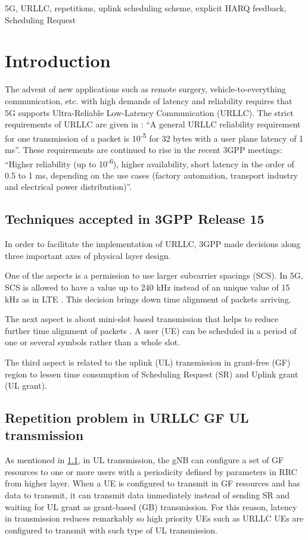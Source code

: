 \documentclass[conference]{IEEEtran}
\begin{document}
\begin{IEEEkeywords}
5G, URLLC, repetitions, uplink scheduling scheme, explicit HARQ feedback, Scheduling Request
\end{IEEEkeywords}

\section{Introduction} \label{I}
The advent of new applications such as remote surgery, vehicle-to-everything communication, etc. with high demands of latency and reliability requires that 5G supports Ultra-Reliable Low-Latency Communication (URLLC). The strict requirements of URLLC are given in \cite{b6}: ``A general URLLC reliability requirement for one transmission of a packet is 10\textsuperscript{-5} for 32 bytes with a user plane latency of 1 ms''. These requirements are continued to rise in the recent 3GPP meetings: ``Higher reliability (up to 10\textsuperscript{-6}), higher availability, short latency in the order of 0.5 to 1 ms, depending on the use cases (factory automation, transport industry and electrical power distribution)''\cite{b8}.

\subsection{Techniques accepted in 3GPP Release 15}\label{IAA}
In order to facilitate the implementation of URLLC, 3GPP made decisions along three important axes of physical layer design.

One of the aspects is a permission to use larger subcarrier spacings (SCS). In 5G, SCS is allowed to have a value up to 240 kHz instead of an unique value of 15 kHz as in LTE \cite{ad2}. This decision brings down time alignment of packets arriving. 

The next aspect is about mini-slot based transmission that helps to reduce further time alignment of packets \cite{ad3}. A user (UE) can be scheduled in a period of one or several symbols rather than a whole slot. 

The third aspect is related to the uplink (UL) transmission in grant-free (GF) region to lessen time consumption of Scheduling Request (SR) and Uplink grant (UL grant)\cite{ad4}.

\subsection{Repetition problem in URLLC GF UL transmission}\label{IBB}
As mentioned in \ref{IAA}, in UL transmission, the gNB can configure a set of GF resources to one or more users with a periodicity defined by parameters in RRC from higher layer. When a UE is configured to transmit in GF resources and has data to transmit, it can transmit data immediately instead of sending SR and waiting for UL grant as grant-based (GB) transmission. For this reason, latency in transmission reduces remarkably so high priority UEs such as URLLC UEs are configured to transmit with such type of UL transmission.
\end{document}
